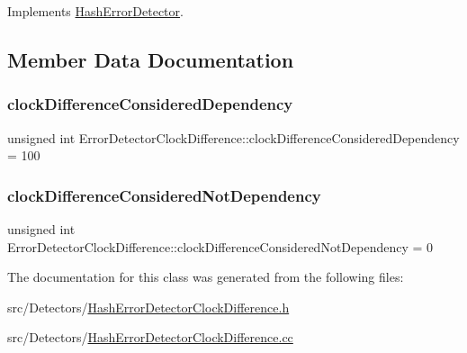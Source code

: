 Implements \hyperlink{class_hash_error_detector_ad7419eaab728b7ed3e394d5aee9eda41}{Hash\+Error\+Detector}.



\subsection{Member Data Documentation}
\mbox{\label{class_error_detector_clock_difference_a0d2a3c4111e8bb4b3c232aacca9a0062}} 
\subsubsection{\texorpdfstring{clock\+Difference\+Considered\+Dependency}{clockDifferenceConsideredDependency}}
{\footnotesize\ttfamily unsigned int Error\+Detector\+Clock\+Difference\+::clock\+Difference\+Considered\+Dependency = 100\hspace{0.3cm}{\ttfamily [private]}}

\mbox{\label{class_error_detector_clock_difference_aa733fc7d2023d62a7418ca20e01e9f5a}} 
\subsubsection{\texorpdfstring{clock\+Difference\+Considered\+Not\+Dependency}{clockDifferenceConsideredNotDependency}}
{\footnotesize\ttfamily unsigned int Error\+Detector\+Clock\+Difference\+::clock\+Difference\+Considered\+Not\+Dependency = 0\hspace{0.3cm}{\ttfamily [private]}}



The documentation for this class was generated from the following files\+:\begin{DoxyCompactItemize}
\item 
src/\+Detectors/\hyperlink{_hash_error_detector_clock_difference_8h}{Hash\+Error\+Detector\+Clock\+Difference.\+h}\item 
src/\+Detectors/\hyperlink{_hash_error_detector_clock_difference_8cc}{Hash\+Error\+Detector\+Clock\+Difference.\+cc}\end{DoxyCompactItemize}
